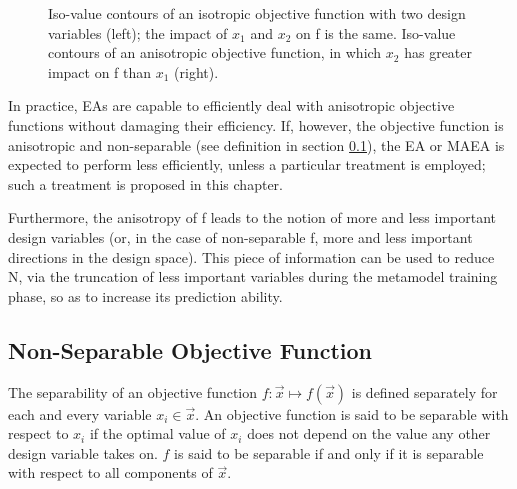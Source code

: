 \begin{figure}[h!]
\begin{minipage}[b]{1.0\linewidth}
 \centering
\end{minipage}
\caption{Iso-value contours of an isotropic objective function with two design variables (left); the impact of $x_1$ and $x_2$ on f is the same. Iso-value contours of an anisotropic objective function, in which $x_2$ has greater impact on f than $x_1$ (right).} 
\label{illc}
\end{figure}

In practice, EAs are capable to efficiently deal with anisotropic objective functions without damaging their efficiency. If, however, the objective function is anisotropic and non-separable (see definition in section \ref{Nonsep}), the EA or MAEA is expected to perform less efficiently, unless a particular treatment is employed; such a treatment is proposed in this chapter.  

Furthermore, the anisotropy of f leads to the notion of more and less important design variables (or, in the case of non-separable f, more and less important directions in the design space). This piece of information can be used to reduce N, via the truncation of less important variables during the metamodel training phase, so as to increase its prediction ability.       


\subsection{Non-Separable Objective Function}     
\label{Nonsep}
The separability of an objective function $f:\vec{x}\mapsto f(\vec{x})$ is defined separately for each and every variable $x_i \in \vec{x}$. An objective function is said to be separable with respect to $x_i$ if the optimal value of $x_i$ does not depend on the value  any other design variable takes on. $f$ is said to be separable if and only if it is separable with respect to all components of $\vec{x}$.



